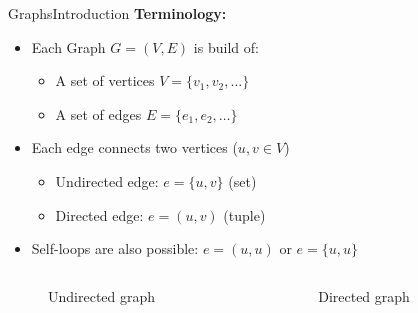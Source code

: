 \begin{frame}{Graphs}{Introduction}
  \textbf{Terminology:}
  \begin{itemize}
    \item<2->
      Each Graph {\color{Mittel-Blau}$G = (V, E)$} is build of:
      \begin{itemize}
        \item<3->
          A set of vertices {\color{Mittel-Blau}$V = \{v_1, v_2, \dotsc\}$}
        \item<4->
          A set of edges {\color{Mittel-Blau}$E = \{e_1, e_2, \dotsc\}$}
       \end{itemize}
     \item<5->
       Each edge connects two vertices
       ({\color{Mittel-Blau}$u, v \in V$})
       \begin{itemize}
         \item<6->
           Undirected edge: {\color{Mittel-Blau}$e = \{u, v\}$} (set)
         \item<7->
           Directed edge: {\color{Mittel-Blau}$e = (u, v)$} (tuple)
        \end{itemize}
      \item<8->
        Self-loops are also possible:
        {\color{Mittel-Blau}$e = (u, u)$} or
        {\color{Mittel-Blau}$e = \{u, u\}$}
  \end{itemize}
  \vspace{-1.0em}
  \begin{columns}
    \begin{column}[b]{0.5\linewidth}
      \begin{figure}
        \begin{adjustbox}{width=0.75\linewidth}
          
        \end{adjustbox}
        \caption{Undirected graph}
        \label{fig:graphs:introduction_undirected}
      \end{figure}
    \end{column}
    \begin{column}[b]{0.5\linewidth}
      \begin{figure}
        \begin{adjustbox}{width=0.75\linewidth}
          
        \end{adjustbox}
        \vspace{-1.0em}
        \caption{Directed graph}
        \label{fig:graphs:introduction_directed}
      \end{figure}
    \end{column}
  \end{columns}
\end{frame}

